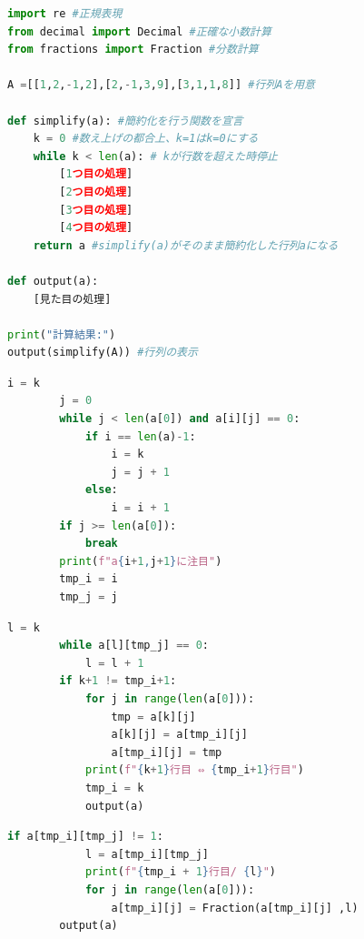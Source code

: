\documentclass[lualatex,paper=a4paper]{jlreq}
\begin{document}
\begin{lstlisting}[language=Python,caption={kに1を加え、1.からやり直す。1.でk>Iとなるか、J列目を超えたとき、計算を終了する。},label=code-sample]
import re #正規表現
from decimal import Decimal #正確な小数計算
from fractions import Fraction #分数計算

A =[[1,2,-1,2],[2,-1,3,9],[3,1,1,8]] #行列Aを用意

def simplify(a): #簡約化を行う関数を宣言
    k = 0 #数え上げの都合上、k=1はk=0にする
    while k < len(a): # kが行数を超えた時停止
        [1つ目の処理]
        [2つ目の処理]
        [3つ目の処理]
        [4つ目の処理]
    return a #simplify(a)がそのまま簡約化した行列aになる

def output(a):
    [見た目の処理]

print("計算結果:")
output(simplify(A)) #行列の表示

\end{lstlisting}


\newpage
\begin{lstlisting}[language=Python,caption={左から右の列へ、各列でk行目から順に0でない数を探す。はじめに見つかる数をnとする。},label=code-sample]
        i = k
        j = 0
        while j < len(a[0]) and a[i][j] == 0:
            if i == len(a)-1:
                i = k
                j = j + 1
            else:
                i = i + 1
        if j >= len(a[0]):
            break
        print(f"a{i+1,j+1}に注目")
        tmp_i = i
        tmp_j = j
\end{lstlisting}

\begin{lstlisting}[language=Python, caption= {nがある行をk行目と入れ替える。},label=code-sample]
        l = k
        while a[l][tmp_j] == 0:
            l = l + 1
        if k+1 != tmp_i+1:
            for j in range(len(a[0])):
                tmp = a[k][j]
                a[k][j] = a[tmp_i][j]
                a[tmp_i][j] = tmp
            print(f"{k+1}行目 ⇔ {tmp_i+1}行目")
            tmp_i = k
            output(a)
\end{lstlisting}

\begin{lstlisting}[language=Python, caption= {k行目をnで割る。},label=code-sample]
        if a[tmp_i][tmp_j] != 1:
            l = a[tmp_i][tmp_j]
            print(f"{tmp_i + 1}行目/ {l}")
            for j in range(len(a[0])):
                a[tmp_i][j] = Fraction(a[tmp_i][j] ,l)
        output(a)
\end{lstlisting}
\end{document}
